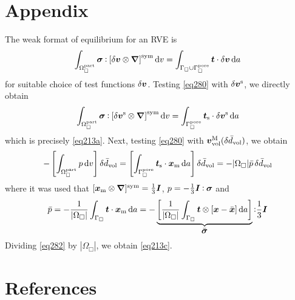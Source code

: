 \documentclass[10pt,a4paper]{article}
\newcommand{\fluid}{\mathrm{part}}
\newcommand{\pore}{\mathrm{pore}}
\newcommand{\surf}{\mathrm{s}}
\begin{document}
\section{Appendix}

The weak format of equilibrium for an RVE is
\begin{equation}
    \int_{\Omega^\fluid_\Box} \ts{\sigma} \dprod \left[\delta \ta{v}\outerp\diff\right]^\sym \dif v =
    \int_{\Gamma_\Box\cup\Gamma_\Box^\pore} \ta{t} \cdot \delta\ta{v} \dif a
\label{eq280}
\end{equation}
for suitable choice of test functions $\delta \boldsymbol{v}$. Testing \eqref{eq280} with $\delta \boldsymbol{v}^{\mathrm{s}}$, we directly obtain
\begin{equation}
    \int_{\Omega^\fluid_\Box} \ts{\sigma} \dprod \left[\delta \ta{v}^\fluct\outerp\diff\right]^\sym \dif v =
    \int_{\Gamma_\Box^\pore} \ta{t}_\surf \cdot \delta\ta{v}^\fluct \dif a
\label{eq281}
\end{equation}
which is precisely \eqref{eq213a}. Next, testing \eqref{eq280} with $\boldsymbol{v}^{\mathrm{M}}_{\mathrm{vol}}(\delta\bar{d}_{\mathrm{vol}})$, we obtain
\begin{equation}
    - \left[\int_{\Omega^\fluid_\Box} p  \dif v \right]\delta\bar{d}_\vol =
    \left[\int_{\Gamma_\Box^\pore} \ta{t}_\surf \cdot \ta{x}_\mean \dif a\right]\delta\bar{d}_\vol =
    - |\Omega_\Box|\bar{p}\,\delta\bar{d}_\vol
\label{eq282}
\end{equation}
where it was used that $[\boldsymbol{x}_{\mathrm{m}}\mathbin{\otimes}\boldsymbol{\nabla}]^{\mathrm{sym}}=\frac{1}{3}\boldsymbol{I}$, $p=-\frac{1}{3}\boldsymbol{I}\mathbin{\vcentcolon}\boldsymbol{\sigma}$ and
\begin{equation}
    \bar{p} = - \frac{1}{|\Omega_\Box|} \int_{\Gamma_\Box} \boldsymbol{t} \cdot \boldsymbol{x}_{\mathrm{m}} \operatorname{d \!} a =
     - \underbrace{\left[\frac{1}{|\Omega_\Box|} \int_{\Gamma_\Box} \boldsymbol{t} \mathbin{\otimes} [\boldsymbol{x}-\bar{\boldsymbol{x}}] \operatorname{d \!} a\right]}_{\displaystyle\bar{\boldsymbol{\sigma}}}  \mathbin{\vcentcolon} \frac{1}{3}\boldsymbol{I}
\end{equation}
Dividing \eqref{eq282} by $|\Omega_\Box|$, we obtain \eqref{eq213c}.


\section{References}



\end{document}

